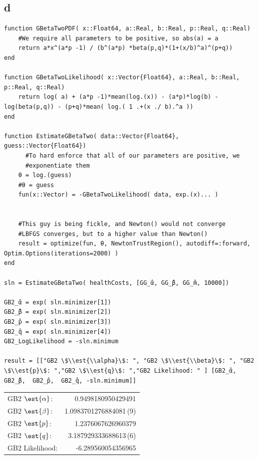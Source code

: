 \documentclass[12pt, letterpaper]{paper}
\begin{document}
\subsection{d}
\label{sec:org901e8dc}
\begin{verbatim}
function GBetaTwoPDF( x::Float64, a::Real, b::Real, p::Real, q::Real)
    #We require all parameters to be positive, so abs(a) = a
    return a*x^(a*p -1) / (b^(a*p) *beta(p,q)*(1+(x/b)^a)^(p+q))
end

function GBetaTwoLikelihood( x::Vector{Float64}, a::Real, b::Real, p::Real, q::Real)
    return log( a) + (a*p -1)*mean(log.(x)) - (a*p)*log(b) - log(beta(p,q)) - (p+q)*mean( log.( 1 .+(x ./ b).^a ))
end

function EstimateGBetaTwo( data::Vector{Float64}, guess::Vector{Float64})
      #To hard enforce that all of our parameters are positive, we
      #exponentiate them
    θ = log.(guess)
    #θ = guess
    fun(x::Vector) = -GBetaTwoLikelihood( data, exp.(x)... )


    #This guy is being fickle, and Newton() would not converge
    #LBFGS converges, but to a higher value than Newton()
    result = optimize(fun, θ, NewtonTrustRegion(), autodiff=:forward, Optim.Options(iterations=2000) )
end

sln = EstimateGBetaTwo( healthCosts, [GG_̂α, GG_̂β, GG_̂m, 10000])

GB2_̂α = exp( sln.minimizer[1])
GB2_̂β = exp( sln.minimizer[2])
GB2_̂p = exp( sln.minimizer[3])
GB2_̂q = exp( sln.minimizer[4])
GB2_LogLikelihood = -sln.minimum

result = [["GB2 \$\\est{\\alpha}\$: ", "GB2 \$\\est{\\beta}\$: ", "GB2 \$\\est{p}\$: ","GB2 \$\\est{q}\$: ","GB2 Likelihood: " ] [GB2_̂α, GB2_̂β,  GB2_̂p,  GB2_̂q, -sln.minimum]]
\end{verbatim}

\begin{center}
\begin{tabular}{lr}
GB2 \(\est{\alpha}\): & 0.9498180950429491\\
GB2 \(\est{\beta}\): & 1.0983701276884081\,(9)\\
GB2 \(\est{p}\): & 1.2376067626960379\\
GB2 \(\est{q}\): & 3.187929333688613\,(6)\\
GB2 Likelihood: & -6.289560054356965\\
\end{tabular}
\end{center}
\end{document}
